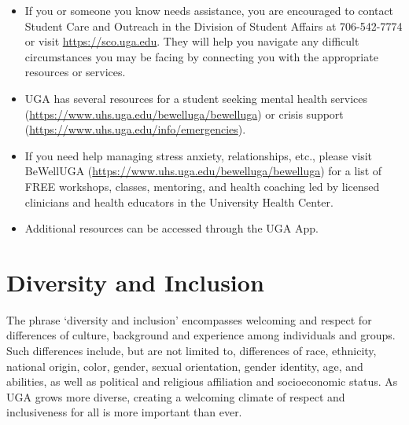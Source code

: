 \documentclass[12pt]{article}
\begin{document}
\begin{itemize}
  \item If you or someone you know needs assistance, you are
    encouraged to contact Student Care and Outreach in the Division of
    Student Affairs at 706-542-7774 or visit \url{https://sco.uga.edu}. They
    will help you navigate any difficult circumstances you may be facing
    by connecting you with the appropriate resources or services.
  \item UGA has several resources for a student seeking mental health
    services (\url{https://www.uhs.uga.edu/bewelluga/bewelluga}) or crisis
    support (\url{https://www.uhs.uga.edu/info/emergencies}).
  \item If you need help managing stress anxiety, relationships, etc.,
    please visit BeWellUGA (\url{https://www.uhs.uga.edu/bewelluga/bewelluga})
    for a list of FREE workshops, classes, mentoring, and health
    coaching led by licensed clinicians and health educators in the
    University Health Center.
  \item Additional resources can be accessed through the UGA App.
\end{itemize}


\vspace{-2mm}
\section*{\normalsize Diversity and Inclusion}
\vspace{-4mm}
The phrase ‘diversity and inclusion’ encompasses welcoming and respect
for differences of culture, background and experience among
individuals and groups. Such differences include, but are not limited
to, differences of race, ethnicity, national origin, color, gender,
sexual orientation, gender identity, age, and abilities, as well as
political and religious affiliation and socioeconomic status. As UGA
grows more diverse, creating a welcoming climate of respect and
inclusiveness for all is more important than ever. 





\end{document}
